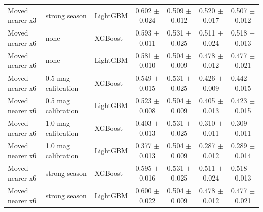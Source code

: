 \begin{tabular}{lllcccc}
Moved nearer x3 & strong season & LightGBM & 0.602 $\pm$ 0.024 & 0.509 $\pm$ 0.012 & 0.520 $\pm$ 0.017 & 0.507 $\pm$ 0.012 \\
Moved nearer x6 & none & XGBoost & 0.593 $\pm$ 0.011 & 0.531 $\pm$ 0.025 & 0.511 $\pm$ 0.024 & 0.518 $\pm$ 0.013 \\
Moved nearer x6 & none & LightGBM & 0.581 $\pm$ 0.010 & 0.504 $\pm$ 0.009 & 0.478 $\pm$ 0.012 & 0.477 $\pm$ 0.021 \\
Moved nearer x6 & 0.5 mag calibration & XGBoost & 0.549 $\pm$ 0.015 & 0.531 $\pm$ 0.025 & 0.426 $\pm$ 0.009 & 0.442 $\pm$ 0.015 \\
Moved nearer x6 & 0.5 mag calibration & LightGBM & 0.523 $\pm$ 0.008 & 0.504 $\pm$ 0.009 & 0.405 $\pm$ 0.013 & 0.423 $\pm$ 0.015 \\
Moved nearer x6 & 1.0 mag calibration & XGBoost & 0.403 $\pm$ 0.013 & 0.531 $\pm$ 0.025 & 0.310 $\pm$ 0.011 & 0.309 $\pm$ 0.011 \\
Moved nearer x6 & 1.0 mag calibration & LightGBM & 0.377 $\pm$ 0.013 & 0.504 $\pm$ 0.009 & 0.287 $\pm$ 0.012 & 0.289 $\pm$ 0.014 \\
Moved nearer x6 & strong season & XGBoost & 0.595 $\pm$ 0.016 & 0.531 $\pm$ 0.025 & 0.511 $\pm$ 0.024 & 0.518 $\pm$ 0.013 \\
Moved nearer x6 & strong season & LightGBM & 0.600 $\pm$ 0.022 & 0.504 $\pm$ 0.009 & 0.478 $\pm$ 0.012 & 0.477 $\pm$ 0.021 \\
\hline
\end{tabular}

